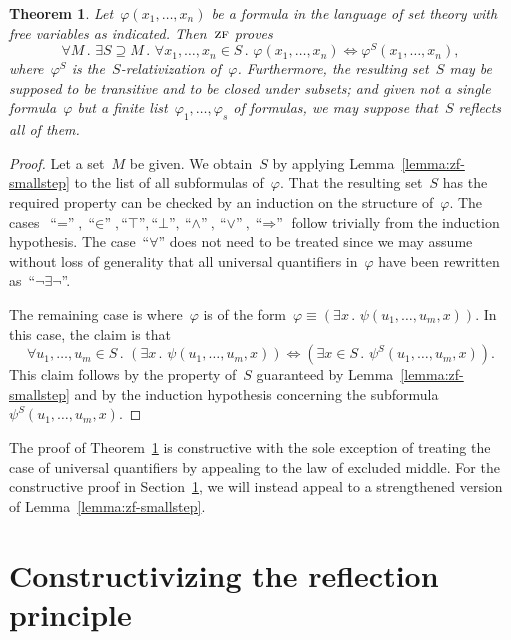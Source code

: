 \documentclass[oneside,reqno]{amsart}
\theoremstyle{definition}
\theoremstyle{plain}
\newtheorem{thm}[defn]{Theorem}
\theoremstyle{remark}
\renewcommand{\_}{\mathpunct{.}\,}
\newcommand{\?}{\,{:}\,}
\newcommand{\ZF}{\textsc{zf}}
\begin{document}
\begin{thm}\label{thm:zf-bigstep}
Let~$\varphi(x_1,\ldots,x_n)$ be a formula in the language of set
theory with free variables as indicated. Then~$\ZF$ proves
\[ \forall M\_
  \exists S \supseteq M\_
  \forall x_1,\ldots,x_n \in S\_
  \varphi(x_1,\ldots,x_n) \Leftrightarrow \varphi^S(x_1,\ldots,x_n), \]
where~$\varphi^S$ is the~$S$-relativization of~$\varphi$. Furthermore, the
resulting set~$S$ may be supposed to be transitive and to be closed under
subsets; and given not a single formula~$\varphi$ but a finite
list~$\varphi_1,\ldots,\varphi_s$ of formulas, we may suppose that~$S$ reflects
all of them.
\end{thm}

\begin{proof}Let a set~$M$ be given. We obtain~$S$ by applying
Lemma~\ref{lemma:zf-smallstep} to the list of all subformulas of~$\varphi$. That
the resulting set~$S$ has the required property can be checked by an induction on the structure
of~$\varphi$. The cases~$\text{``$=$''}, \text{``$\in$''}, \text{``$\top$''},
\text{``$\bot$''}, \text{``$\wedge$''},
\text{``$\vee$''}, \text{``$\Rightarrow$''}$ follow
trivially from the induction hypothesis. The case~``$\forall$'' does
not need to be treated since we may assume without loss of generality that all
universal quantifiers in~$\varphi$ have been rewritten
as~``$\neg\exists\neg$''.

The remaining case is where~$\varphi$ is of the form~$\varphi \equiv (\exists
x\_ \psi(u_1,\ldots,u_m,x))$. In this case, the claim is that
\[ \forall u_1,\ldots,u_m \in S\_
  (\exists x\_ \psi(u_1,\ldots,u_m,x)) \Longleftrightarrow
  (\exists x \in S\_ \psi^S(u_1,\ldots,u_m,x)). \]
This claim follows by the property of~$S$ guaranteed by
Lemma~\ref{lemma:zf-smallstep} and by the induction hypothesis concerning the
subformula~$\psi^S(u_1,\ldots,u_m,x)$.
\end{proof}

The proof of Theorem~\ref{thm:zf-bigstep} is constructive with the sole
exception of treating the case of universal quantifiers by appealing to the law
of excluded middle. For the constructive proof in
Section~\ref{sect:constructive-proof}, we will instead appeal to a strengthened
version of Lemma~\ref{lemma:zf-smallstep}.


\section{Constructivizing the reflection principle}
\label{sect:constructive-proof}
\end{document}
